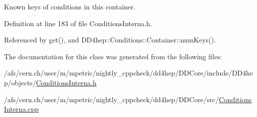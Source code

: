 Known keys of conditions in this container. 

Definition at line 183 of file ConditionsInterna.h.

Referenced by get(), and DD4hep::Conditions::Container::numKeys().

The documentation for this class was generated from the following files:\begin{DoxyCompactItemize}
\item 
/afs/cern.ch/user/m/mpetric/nightly\_\-cppcheck/dd4hep/DDCore/include/DD4hep/objects/\hyperlink{_d_d_core_2include_2_d_d4hep_2objects_2_conditions_interna_8h}{ConditionsInterna.h}\item 
/afs/cern.ch/user/m/mpetric/nightly\_\-cppcheck/dd4hep/DDCore/src/\hyperlink{_d_d_core_2src_2_conditions_interna_8cpp}{ConditionsInterna.cpp}\end{DoxyCompactItemize}
